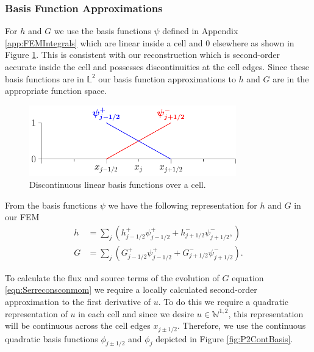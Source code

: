 \subsubsection{Basis Function Approximations}
For $h$ and $G$ we use the basis functions $\psi$ defined in Appendix \ref{app:FEMIntegrals} which are linear inside a cell and $0$ elsewhere as shown in Figure \ref{fig:P1DiscBasis}. This is consistent with our reconstruction which is second-order accurate inside the cell and possesses discontinuities at the cell edges. Since these basis functions are in $\mathbb{L}^2$ our basis function approximations to $h$ and $G$ are in the appropriate function space.

\begin{figure}
	\centering
	\includegraphics[width=0.8\textwidth]{./chp3/figures/P1.pdf}
	\caption{Discontinuous linear basis functions over a cell.}
	\label{fig:P1DiscBasis}
\end{figure}
From the basis functions $\psi$ we have the following representation for $h$ and $G$ in our FEM
\begin{subequations}
\begin{align}
\label{eqn:FEapproxtoh}
h &= \sum_j \left( h^+_{j-1/2}\psi^+_{j-1/2}  + h^-_{j+1/2}\psi^-_{j+1/2}, \right) \\
G &= \sum_j\left( G^+_{j-1/2}\psi^+_{j-1/2}  + G^-_{j+1/2}\psi^-_{j+1/2}\right).
\label{eqn:FEapproxtoG}
\end{align}
\label{eqn:FEapproxtohG}
\end{subequations}

To calculate the flux and source terms of the evolution of $G$ equation \eqref{eqn:Serreconsconmom} we require a locally  calculated second-order approximation to the first derivative of $u$. To do this we require a quadratic representation of $u$ in each cell and since we desire $u\in\mathbb{W}^{1,2}$, this representation will be continuous across the cell edges $x_{j \pm 1/2}$. Therefore, we use the continuous quadratic basis functions $\phi_{j\pm1/2} $ and $\phi_{j} $ depicted in Figure \ref{fig:P2ContBasis}.

